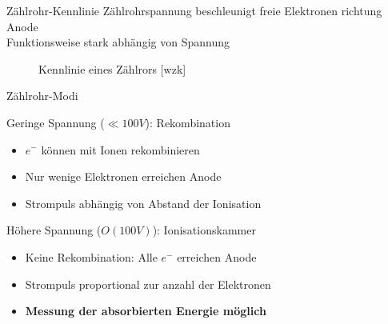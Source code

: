\documentclass{beamer}
\begin{document}

\begin{frame}{Zählrohr-Kennlinie}
	Zählrohrspannung beschleunigt freie Elektronen richtung Anode \\
	Funktionsweise stark abhängig von Spannung
	
	\begin{figure}[htbp]
	  \centering
	  
	  \caption{Kennlinie eines Zählrors [wzk]}
	\end{figure}
	
\end{frame}	


\begin{frame}{Zählrohr-Modi}
	\begin{block}{Geringe Spannung ($\ll 100V$): Rekombination}
		\begin{itemize}
		  	\item $e^-$ können mit Ionen rekombinieren
		  	\item Nur wenige Elektronen erreichen Anode
		  	\item Strompuls abhängig von Abstand der Ionisation
		\end{itemize}
	\end{block}
	
	\begin{block}{Höhere Spannung ($O(100V)$): Ionisationskammer}
		\begin{itemize}
		  	\item Keine Rekombination: Alle $e^-$ erreichen Anode
		  	\item Strompuls proportional zur anzahl der Elektronen
			\item \textbf{Messung der absorbierten Energie möglich}
		\end{itemize}
	\end{block}
	
\end{frame}
\end{document}
